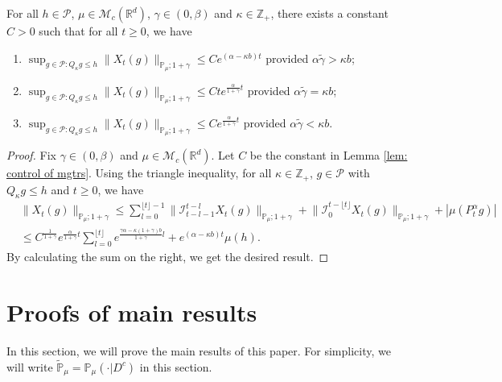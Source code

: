 \documentclass[EJP]{ejpecp} %
\begin{document}
\begin{lemma}
  \label{lem:P:M:uc}
  For all $h \in \mathcal P$, $\mu \in \mathcal M_c(\mathbb R^d)$, $\gamma\in (0, \beta)$ and $\kappa \in \mathbb Z_+$, there exists a constant $C > 0$ such that for all $t\geq 0$, we have
  \begin{enumerate}
  \item
    \label{item:P:M:uc:1}
    $\sup_{g\in \mathcal P: Q_\kappa g \leq h}\|X_t(g)\|_{\mathbb{P}_{\mu};1+\gamma}\leq C e^{(\alpha-\kappa b)t}$ provided $\alpha \tilde \gamma > \kappa b$;
  \item
    \label{item:P:M:uc:2}
    $\sup_{g\in \mathcal P: Q_\kappa g \leq h}\|X_t(g)\|_{\mathbb{P}_{\mu};1+\gamma}\leq C te^{\frac{\alpha}{1+\gamma}t}$ provided $\alpha \tilde \gamma = \kappa b$;
  \item
    \label{item:P:M:uc:3}
    $\sup_{g\in \mathcal P: Q_\kappa g \leq h} \|X_t(g)\|_{\mathbb{P}_{\mu};1+\gamma}\leq C e^{\frac{\alpha}{1+\gamma}t}$ provided $\alpha \tilde \gamma < \kappa b$.
  \end{enumerate}
\end{lemma}

\begin{proof}
  Fix $\gamma \in (0,\beta)$ and $\mu \in \mathcal M_c(\mathbb R^d)$.
  Let $C$ be the constant in Lemma \ref{lem: control of mgtrs}.
  Using the triangle inequality, for all $\kappa\in \mathbb Z_+$, $g \in \mathcal P$ with $Q_\kappa g \leq h$ and $t\geq 0$, we have
  \begin{align}
    & \|X_t(g)\|_{\mathbb P_\mu;1+\gamma}
      \leq \sum_{l=0}^{\lfloor t\rfloor - 1}\big\| \mathcal{I}_{t-l-1}^{t-l}X_t(g) \big\|_{\mathbb P_\mu;1+\gamma}+\big\| \mathcal{I}_{0}^{t-\lfloor t \rfloor}X_t(g)  \big\|_{\mathbb P_\mu;1+\gamma} + |\mu(P^\alpha_t g)| \\
    & \leq C^{\frac{1}{1+\gamma}} e^{\frac{\alpha}{1+\gamma}t} \sum_{l=0}^{\lfloor t\rfloor} e^{\frac{\gamma\alpha-\kappa (1+\gamma)b}{1+\gamma} l} + e^{(\alpha - \kappa b)t} \mu(h).
  \end{align}
  By calculating the sum on the right, we get the desired result.
\end{proof}

\section{Proofs of main results}
\label{proofs of main results}
In this section, we will prove the main results of this paper.
For simplicity, we will write $\mathbb{\widetilde{P}}_{\mu}=\mathbb{P}_{\mu}(\cdot|D^c)$ in this section.
\end{document}
